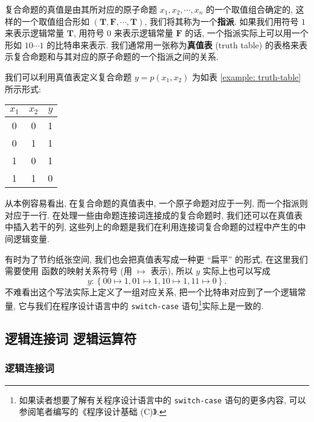 \documentclass[10pt,UTF8]{book} %
\begin{document}
复合命题的真值是由其所对应的原子命题 $x_1, x_2, \cdots, x_n$ 的一个取值组合确定的, 这样的一个取值组合形如
$(\mathbf{T}, \mathbf{F}, \cdots, \mathbf{T})$, 我们将其称为一个\textbf{指派}.
如果我们用符号 $1$ 来表示逻辑常量 $\mathbf{T}$, 用符号 $0$ 来表示逻辑常量 $\mathbf{F}$ 的话,
一个指派实际上可以用一个形如 $10\cdots1$ 的比特串来表示. 我们通常用一张称为\textbf{真值表}
(truth table) 的表格来表示复合命题和与其对应的原子命题的一个指派之间的关系.

\begin{example}
    \label{与非运算}
    我们可以利用真值表定义复合命题 $y = p(x_1, x_2)$ 为如表 \ref{example: truth-table} 所示形式:
    {
    \label{example: truth-table} %
    \begin{longtable}{cc|c}
        \toprule
        $x_1$ & $x_2$ & $y$ \\
        \midrule
        \endhead
        \bottomrule
        \endfoot
    
        0 & 0 & 1 \\
        0 & 1 & 1 \\
        1 & 0 & 1 \\
        1 & 1 & 0 \\
    \end{longtable}}
    从本例容易看出, 在复合命题的真值表中, 一个原子命题对应于一列, 而一个指派则对应于一行.
    在处理一些由命题连接词连接成的复合命题时, 我们还可以在真值表中插入若干的列,
    这些列上的命题是我们在利用连接词复合命题的过程中产生的中间逻辑变量.

    有时为了节约纸张空间, 我们也会把真值表写成一种更 “扁平” 的形式, 在这里我们需要使用
    函数的映射关系符号 (用 $\mapsto$ 表示), 所以 $y$ 实际上也可以写成
    \[ y: \left\{
        00 \mapsto 1,
        01 \mapsto 1,
        10 \mapsto 1,
        11 \mapsto 0
    \right\}. \]
    不难看出这个写法实际上定义了一组对应关系, 把一个比特串对应到了一个逻辑常量,
    它与我们在程序设计语言中的 \lstinline|switch-case| 语句\footnote{
        如果读者想要了解有关程序设计语言中的 \lstinline|switch-case| 语句的更多内容,
        可以参阅笔者编写的《程序设计基础 (C)》.
    }实际上是一致的.
\end{example}

\subsection{逻辑连接词 \quad 逻辑运算符}

\subsubsection{逻辑连接词}
\end{document}
